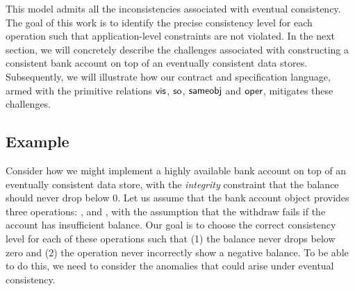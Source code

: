 This model admits all the inconsistencies associated with eventual
consistency. The goal of this work is to identify the precise consistency
level for each operation such that application-level constraints are not
violated. In the next section, we will concretely describe the challenges
associated with constructing a consistent bank account on top of an
eventually consistent data stores. Subsequently, we will illustrate how our
contract and specification language, armed with the primitive relations
${\normalfont \textsf{vis}}$, ${\normalfont \textsf{so}}$, ${\normalfont \textsf{sameobj}}$ and ${\normalfont \textsf{oper}}$, mitigates these challenges.

\subsection{Example}

Consider how we might implement a highly available bank account on top of an
eventually consistent data store, with the \emph{integrity} constraint that
the balance should never drop below 0. Let us assume that the bank account
object provides three operations: ,  and
, with the assumption that the withdraw fails if the account
has insufficient balance. Our goal is to choose the correct consistency
level for each of these operations such that (1) the balance never drops
below zero and (2) the  operation never incorrectly show a
negative balance. To be able to do this, we need to consider the anomalies
that could arise under eventual consistency.

